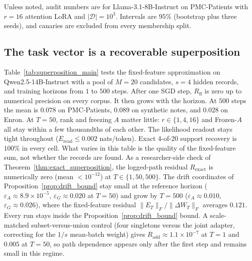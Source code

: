 \documentclass[11pt]{article}
\newcommand{\D}{\mathcal{D}}
\theoremstyle{plain}
\theoremstyle{definition}
\begin{document}
Unless noted, audit numbers are for Llama-3.1-8B-Instruct on PMC-Patients with $r{=}16$ attention LoRA and $|\D|{=}10^3$.
Intervals are $95\%$ (bootstrap plus three seeds), and canaries are excluded from every membership split.

\subsection{The task vector is a recoverable superposition}
\label{sec:results_superposition}

Table~\ref{tab:superposition_main} tests the fixed-feature approximation on Qwen2.5-14B-Instruct with a pool of $M{=}20$ candidates, $s{=}4$ hidden records, and training horizons from $1$ to $500$ steps.
After one SGD step, $R_{\mathrm{ff}}$ is zero up to numerical precision on every corpus.
It then grows with the horizon. At $500$ steps the mean is $0.078$ on PMC-Patients, $0.089$ on synthetic notes, and $0.028$ on Enron.
At $T{=}50$, rank and freezing $A$ matter little: $r\in\{1,4,16\}$ and Frozen-$A$ all stay within a few thousandths of each other.
The likelihood readout stays tight throughout ($E_{\mathrm{read}}\leq0.002$ nats/token).
Exact 4-of-20 support recovery is $100\%$ in every cell. What varies in this table is the quality of the fixed-feature sum, not whether the records are found.
As a researcher-side check of Theorem~\ref{thm:exact_superposition}, the logged-path residual $R_{\mathrm{exact}}$ is numerically zero (mean $<10^{-12}$) at $T\in\{1,50,500\}$. The drift coordinates of Proposition~\ref{prop:drift_bound} stay small at the reference horizon ($\varepsilon_A\approx8.9{\times}10^{-5}$, $\varepsilon_G\approx0.020$ at $T{=}50$) and grow by $T{=}500$ ($\varepsilon_A\approx0.010$, $\varepsilon_G\approx0.026$), where the fixed-feature residual $\|E_T\|_F/\|\Delta W_T\|_F$ averages $0.121$. Every run stays inside the Proposition~\ref{prop:drift_bound} bound. A scale-matched subset-versus-union control (four singletons versus the joint adapter, correcting for the $1/s$ mean-batch weight) gives $R_{\mathrm{add}}\approx1.1{\times}10^{-7}$ at $T{=}1$ and $0.005$ at $T{=}50$, so path dependence appears only after the first step and remains small in this regime.
\end{document}
